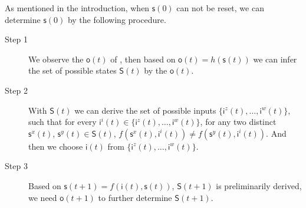 


As mentioned in the introduction, when $\mathsf{s}(0)$ can not be reset, we can determine $\mathsf{s}(0)$ %
by the following procedure.
\begin{description}
\item[Step 1] We observe the $\mathsf{o}(t)$ of \BCN, then based on $\mathsf{o}(t)=h(\mathsf{s}(t))$ we can infer the set of possible states $\mathsf{S}(t)$ by the $\mathsf{o}(t)$.
\item[Step 2] With $\mathsf{S}(t)$ we can derive the set of possible inputs $\{\mathsf{i}^z(t),\ldots,\mathsf{i}^w(t)\}$, such that for every $\mathsf{i}^{i}(t)\in \{\mathsf{i}^z(t),\ldots,\mathsf{i}^w(t)\}$, for any two distinct $\mathsf{s}^{x}(t)$, $\mathsf{s}^{y}(t) \in \mathsf{S}(t)$, $f(\mathsf{s}^{x}(t), \mathsf{i}^{i}(t))\neq f(\mathsf{s}^{y}(t),\mathsf{i}^{i}(t))$. And then we choose $\mathsf{i}(t)$ from $\{\mathsf{i}^z(t),\ldots,\mathsf{i}^w(t)\}$.
\item[Step 3] Based on $\mathsf{s}(t+1)= f({\mathsf{i}(t)},{\mathsf{s}(t)})$, $\mathsf{S}(t+1)$ is preliminarily derived, we need $\mathsf{o}(t+1)$ to further determine $\mathsf{S}(t+1)$. 
\end{description}

